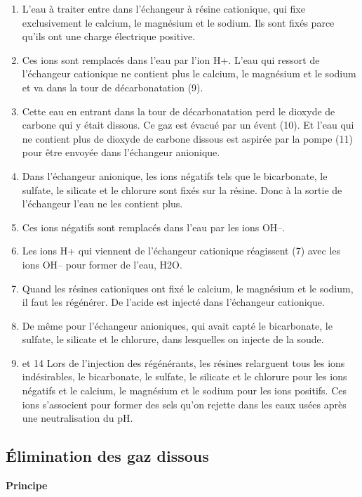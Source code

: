 \begin{enumerate}
\item L’eau à traiter entre dans l’échangeur à résine cationique, qui fixe exclusivement le calcium, le magnésium et le sodium. Ils sont fixés parce qu’ils ont une charge électrique positive.
\item  Ces ions sont remplacés dans l’eau par l’ion H+. L’eau qui ressort de l’échangeur cationique ne contient plus le calcium, le magnésium et le sodium et va dans la tour de décarbonatation (9).
\item  Cette eau en entrant dans la tour de décarbonatation perd le dioxyde de carbone qui y était dissous. Ce gaz est évacué par un évent (10). Et l’eau qui ne contient plus de dioxyde de carbone dissous est aspirée par la pompe (11) pour être envoyée dans l’échangeur anionique.
\item  Dans l’échangeur anionique, les ions négatifs tels que le bicarbonate, le sulfate, le silicate et le chlorure sont fixés sur la résine. Donc à la sortie de l’échangeur l’eau ne les contient plus.
\item Ces ions négatifs sont remplacés dans l’eau par les ions OH–.
\item  Les ions H+ qui viennent de l’échangeur cationique réagissent (7) avec les ions OH– pour former de l’eau, H2O.
\item  Quand les résines cationiques ont fixé le calcium, le magnésium et le sodium, il faut les régénérer. De l’acide est injecté dans l’échangeur cationique.
\item  De même pour l’échangeur anioniques, qui avait capté le bicarbonate, le sulfate, le silicate et le chlorure, dans lesquelles on injecte de la soude.
\item  et 14 Lors de l’injection des régénérants, les résines relarguent tous les ions indésirables, le bicarbonate, le sulfate, le silicate et le chlorure pour les ions négatifs et le calcium, le magnésium et le sodium pour les ions positifs. Ces ions s’associent pour former des sels qu’on rejette dans les eaux usées après une neutralisation du pH.

\end{enumerate}

\subsection{Élimination des gaz dissous}

\vspace{0.3cm}
\textbf{Principe}
\vspace{0.3cm}

